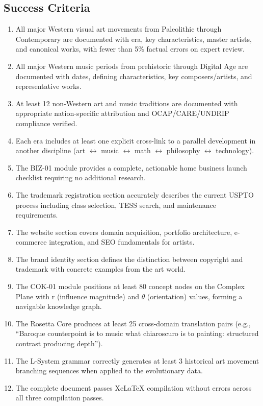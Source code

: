 \documentclass[11pt,letterpaper]{article}
\begin{document}
\subsection{Success Criteria}

\begin{enumerate}[leftmargin=2em]
  \item All major Western visual art movements from Paleolithic through Contemporary are documented with era, key characteristics, master artists, and canonical works, with fewer than 5\% factual errors on expert review.
  \item All major Western music periods from prehistoric through Digital Age are documented with dates, defining characteristics, key composers/artists, and representative works.
  \item At least 12 non-Western art and music traditions are documented with appropriate nation-specific attribution and OCAP/CARE/UNDRIP compliance verified.
  \item Each era includes at least one explicit cross-link to a parallel development in another discipline (art $\leftrightarrow$ music $\leftrightarrow$ math $\leftrightarrow$ philosophy $\leftrightarrow$ technology).
  \item The BIZ-01 module provides a complete, actionable home business launch checklist requiring no additional research.
  \item The trademark registration section accurately describes the current USPTO process including class selection, TESS search, and maintenance requirements.
  \item The website section covers domain acquisition, portfolio architecture, e-commerce integration, and SEO fundamentals for artists.
  \item The brand identity section defines the distinction between copyright and trademark with concrete examples from the art world.
  \item The COK-01 module positions at least 80 concept nodes on the Complex Plane with r (influence magnitude) and $\theta$ (orientation) values, forming a navigable knowledge graph.
  \item The Rosetta Core produces at least 25 cross-domain translation pairs (e.g., ``Baroque counterpoint is to music what chiaroscuro is to painting: structured contrast producing depth'').
  \item The L-System grammar correctly generates at least 3 historical art movement branching sequences when applied to the evolutionary data.
  \item The complete document passes XeLaTeX compilation without errors across all three compilation passes.
\end{enumerate}
\end{document}
